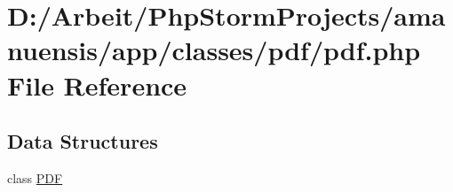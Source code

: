 \hypertarget{a00095}{}\section{D\+:/\+Arbeit/\+Php\+Storm\+Projects/amanuensis/app/classes/pdf/pdf.php File Reference}
\label{a00095}
\subsection*{Data Structures}
\begin{DoxyCompactItemize}
\item 
class \hyperlink{a00033}{P\+D\+F}
\end{DoxyCompactItemize}
